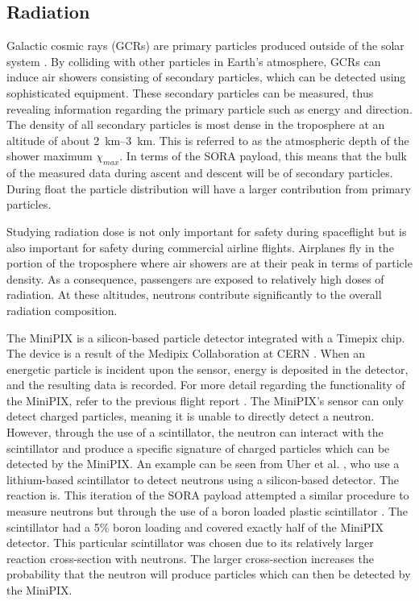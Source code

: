 \subsection{Radiation}
\label{sec: Radiation Background}

Galactic cosmic rays (GCRs) are primary particles produced outside of the solar system \cite{GCRs}.
By colliding with other particles in Earth's atmosphere, GCRs can induce air showers consisting of secondary particles, which can be detected using sophisticated equipment.
These secondary particles can be measured, thus revealing information regarding the primary particle such as energy and direction. 
The density of all secondary particles \cite{Frank} is most dense in the troposphere at an altitude of about \SIrange{2}{3}{\kilo\meter}.
This is referred to as the atmospheric depth of the shower maximum $\chi _{max}$.
In terms of the SORA payload, this means that the bulk of the measured data during ascent and descent will 
be of secondary particles.
During float the particle distribution will have a larger contribution from primary particles.

Studying radiation dose is not only important for safety during spaceflight but is also important for safety during commercial airline flights.
Airplanes fly in the portion of the troposphere where air showers are at their peak in terms of particle density. As a consequence, passengers are exposed to relatively high doses of radiation.
At these altitudes, neutrons contribute significantly to the overall radiation composition.

The MiniPIX \cite{silicon_sensor} is a silicon-based particle detector integrated with a Timepix \cite{timepix} chip. The device is a result of the Medipix Collaboration at CERN \cite{medipix}. 
When an energetic particle is incident upon the sensor, energy is deposited in the detector, and the resulting data is recorded.
For more detail regarding the functionality of the MiniPIX, refer to the previous flight report \cite{SORA}.
The MiniPIX's sensor can only detect charged particles, meaning it is unable to directly detect a neutron. However, through the use of a scintillator, the neutron can interact with the scintillator and produce a specific signature of charged particles which can be detected by the MiniPIX.
An example can be seen from Uher et al. \cite{Uher}, who use a lithium-based scintillator to detect neutrons using a silicon-based detector. The reaction is.
This iteration of the SORA payload attempted a similar procedure to measure neutrons but through the use of a boron loaded plastic scintillator \cite{BoronScintillator}.
The scintillator had a 5\% boron loading and covered exactly half of the MiniPIX detector.
This particular scintillator was chosen due to its relatively larger reaction cross-section with neutrons.
The larger cross-section increases the probability that the neutron will produce particles which can then be detected by the MiniPIX.